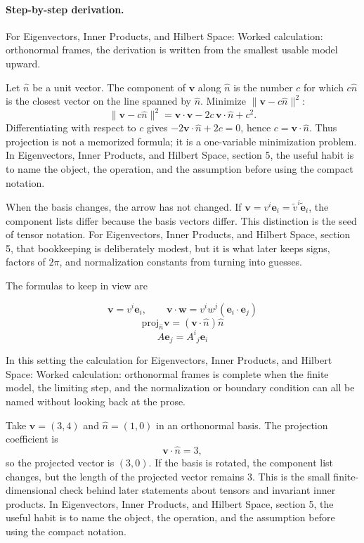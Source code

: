 \paragraph{Step-by-step derivation.}

For Eigenvectors, Inner Products, and Hilbert Space: Worked calculation: orthonormal frames, the derivation is written from the smallest usable model upward.

Let \(\hat n\) be a unit vector.  The component of \(\bm v\) along \(\hat n\) is the number \(c\) for which \(c\hat n\) is the closest vector on the line spanned by \(\hat n\).  Minimize \(\|\bm v-c\hat n\|^2\):
\[
  \|\bm v-c\hat n\|^2=\bm v\cdot\bm v-2c\,\bm v\cdot\hat n+c^2.
\]
Differentiating with respect to \(c\) gives \(-2\bm v\cdot\hat n+2c=0\), hence \(c=\bm v\cdot\hat n\).  Thus projection is not a memorized formula; it is a one-variable minimization problem.  In Eigenvectors, Inner Products, and Hilbert Space, section 5, the useful habit is to name the object, the operation, and the assumption before using the compact notation.

When the basis changes, the arrow has not changed.  If \(\bm v=v^i\bm e_i=\tilde v^i\tilde{\bm e}_i\), the component lists differ because the basis vectors differ.  This distinction is the seed of tensor notation.  For Eigenvectors, Inner Products, and Hilbert Space, section 5, that bookkeeping is deliberately modest, but it is what later keeps signs, factors of \(2\pi\), and normalization constants from turning into guesses.

The formulas to keep in view are

\[
  \bm v=v^i\bm e_i,\qquad \bm v\cdot\bm w=v^iw^j(\bm e_i\cdot\bm e_j)
\]
\[
  \mathrm{proj}_{\hat n}\bm v=(\bm v\cdot\hat n)\hat n
\]
\[
  A\bm e_j=A^i{}_j\bm e_i
\]

In this setting the calculation for Eigenvectors, Inner Products, and Hilbert Space: Worked calculation: orthonormal frames is complete when the finite model, the limiting step, and the normalization or boundary condition can all be named without looking back at the prose.




\begin{example}
Take \(\bm v=(3,4)\) and \(\hat n=(1,0)\) in an orthonormal basis.  The projection coefficient is
\[
  \bm v\cdot\hat n=3,
\]
so the projected vector is \((3,0)\).  If the basis is rotated, the component list changes, but the length of the projected vector remains \(3\).  This is the small finite-dimensional check behind later statements about tensors and invariant inner products.  In Eigenvectors, Inner Products, and Hilbert Space, section 5, the useful habit is to name the object, the operation, and the assumption before using the compact notation.
\end{example}




